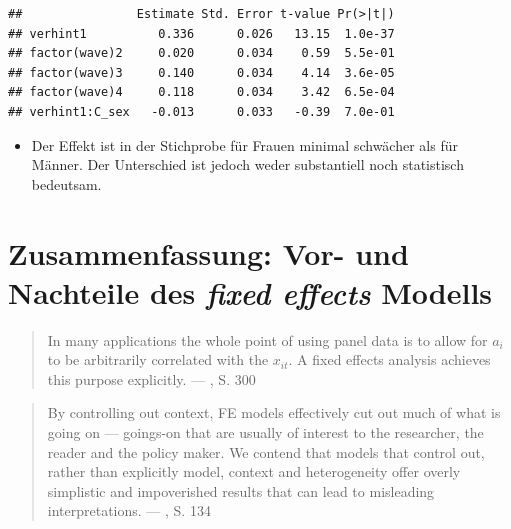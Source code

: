 \documentclass[
]{book}
\providecommand{\tightlist}{%
  \setlength{\itemsep}{0pt}\setlength{\parskip}{0pt}}
\begin{document}
\begin{verbatim}
##                Estimate Std. Error t-value Pr(>|t|)
## verhint1          0.336      0.026   13.15  1.0e-37
## factor(wave)2     0.020      0.034    0.59  5.5e-01
## factor(wave)3     0.140      0.034    4.14  3.6e-05
## factor(wave)4     0.118      0.034    3.42  6.5e-04
## verhint1:C_sex   -0.013      0.033   -0.39  7.0e-01
\end{verbatim}

\begin{itemize}
\tightlist
\item
  Der Effekt ist in der Stichprobe für Frauen minimal schwächer als für Männer. Der Unterschied ist jedoch weder substantiell noch statistisch bedeutsam.
\end{itemize}

\hypertarget{zusammenfassung-vor--und-nachteile-des-fixed-effects-modells}{%
\section{\texorpdfstring{Zusammenfassung: Vor- und Nachteile des \emph{fixed effects} Modells}{Zusammenfassung: Vor- und Nachteile des fixed effects Modells}}\label{zusammenfassung-vor--und-nachteile-des-fixed-effects-modells}}

\begin{quote}
In many applications the whole point of using panel data is to allow for \(a_i\) to be arbitrarily correlated with the \(x_{it}\). A fixed effects analysis achieves this purpose explicitly. --- \citet{wooldridge10}, S. 300
\end{quote}

\begin{quote}
By controlling out context, FE models effectively cut out much of what is going on --- goings-on that are usually of interest to the researcher, the reader and the policy maker. We contend that models that control out, rather than explicitly model, context and heterogeneity offer overly simplistic and impoverished results that can lead to misleading interpretations. --- \citet{bellExplainingFixedEffects2015}, S. 134
\end{quote}
\end{document}
